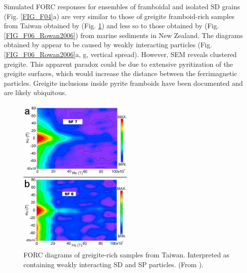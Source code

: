 Simulated FORC responses for ensembles of framboidal and isolated SD grains (Fig. \ref{FIG_F04}a) are very similar to those of greigite framboid-rich samples from Taiwan obtained by \citet{Chou2012} (Fig. \ref{FIG_F06_Chou2012}) and less so to those obtained by \citet{Rowan2006} (Fig. \ref{FIG_F06_Rowan2006}) from marine sediments in New Zealand. The diagrams obtained by \citet{Rowan2006} appear to be caused by weakly interacting particles (Fig. \ref{FIG_F06_Rowan2006}a, g, vertical spread). However, SEM reveals clustered greigite. This apparent paradox could be due to extensive pyritization of the greigite surfaces, which would increase the distance between the ferrimagnetic particles. Greigite inclusions inside pyrite framboids have been documented \citep{Ebert2018} and are likely ubiquitous.
\begin{figure}
\centering
\includegraphics[width=0.5\textwidth]{research-4/figs/Chou2012.pdf}
\caption[FORC diagram of greigite-rich samples from Taiwan]{FORC diagrams of greigite-rich samples from Taiwan. Interpreted as containing weakly interacting SD and SP particles. (From \citet{Chou2012}).}
\label{FIG_F06_Chou2012}
\end{figure}

